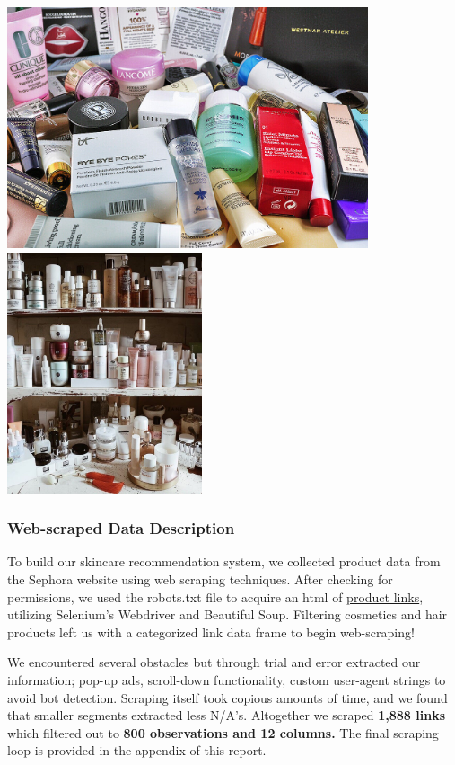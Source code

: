 \documentclass[
]{article}
\begin{document}
\includegraphics[width=4.1875in,height=\textheight]{data/s-l1200.jpg}\includegraphics[width=2.26042in,height=\textheight]{data/prod.jpeg}

\subsubsection{Web-scraped Data
Description}\label{web-scraped-data-description}

To build our skincare recommendation system, we collected product data
from the Sephora website using web scraping techniques. After checking
for permissions, we used the robots.txt file to acquire an html of
\href{https://www.sephora.com/sitemaps/products-sitemap_en-CA.xml}{product
links}, utilizing Selenium's Webdriver and Beautiful Soup. Filtering
cosmetics and hair products left us with a categorized link data frame
to begin web-scraping!

We encountered several obstacles but through trial and error extracted
our information; pop-up ads, scroll-down functionality, custom
user-agent strings to avoid bot detection. Scraping itself took copious
amounts of time, and we found that smaller segments extracted less
N/A's. Altogether we scraped \textbf{1,888 links} which filtered out to
\textbf{800 observations and 12 columns.} The final scraping loop is
provided in the appendix of this report.
\end{document}
